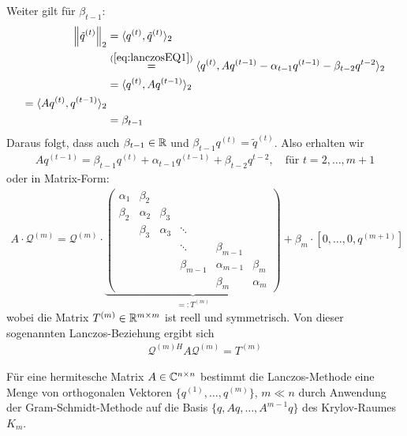 Weiter gilt für $\beta_{t-1}$:
%
\begin{align*}
  \vertn{2}{\tilde{q}^{(t)}}_2 
  &= \langle q^{(t)}, \tilde{q}^{(t)}\rangle_2 \\
  &\stackrel{(\ref{eq:lanczosEQ1})}{=} \langle q^{(t)}, Aq^{(t-1)}-\alpha_{t-1}q^{(t-1)}-\beta_{t-2}q^{t-2}\rangle_2 \\
  &= \langle q^{(t)}, Aq^{(t-1)}\rangle_2 \\
  = \langle Aq^{(t)}, q^{(t-1)}\rangle_2 \\
  &= \beta_{t-1}
\end{align*}
%
Daraus folgt, dass auch $\beta_{t-1}\in\mathbb R$ und $\beta_{t-1}q^{(t)} = \tilde{q}^{(t)}$. Also erhalten wir 
\begin{align*}
  Aq^{(t-1)} = \beta_{t-1}q^{(t)} + \alpha_{t-1}q^{(t-1)} + \beta_{t-2}q^{t-2},\quad\text{für } t=2,\dots,m+1
\end{align*}
%
oder in Matrix-Form:
%
\begin{align*}A\cdot \mathcal{Q}^{(m)} = \mathcal{Q}^{(m)}\cdot\underbrace{
  \begin{pmatrix}
    \alpha_1 & \beta_2 & & & & \\
    \beta_2 & \alpha_2 & \beta_3 & & & \\
    & \beta_3 & \alpha_3 & \ddots & & \\
    & & & \ddots & \beta_{m-1} & \\
    & & & \beta_{m-1} & \alpha_{m-1} & \beta_m \\
    & & & & \beta_m & \alpha_m
  \end{pmatrix}}_{=:T^{(m)}} + \beta_m\cdot[0,\dots,0,q^{(m+1)}]
\end{align*}
%
wobei die Matrix $T^{(m)}\in\mathbb R^{m\times m}$ ist reell und symmetrisch. Von dieser sogenannten Lanczos-Beziehung
ergibt sich
%
\begin{align*}
  \mathcal{Q}^{(m)H} A \mathcal{Q}^{(m)} = T^{(m)}
\end{align*} 
%
\begin{defbox}
  Für eine hermitesche Matrix $A\in\mathbb C  ^{n\times n}$ bestimmt die Lanczos-Methode eine Menge von orthogonalen 
  Vektoren $\{q^{(1)},\dots,q^{(m)}\}$, $m\ll n$ durch Anwendung der Gram-Schmidt-Methode auf die Basis 
  $\{q,Aq,\dots,A^{m-1}q\}$ des Krylov-Raumes $K_m$.
\end{defbox}

